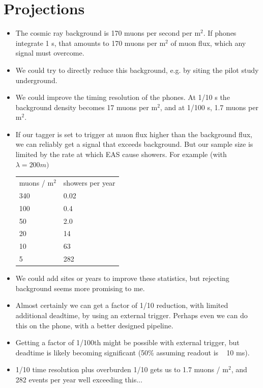 \documentclass[12pt]{article}
\begin{document}
\section{Projections}
\begin{itemize}

\item The cosmic ray background is 170 muons per second per m$^2$.  If
  phones integrate 1 s, that amounts to 170 muons per m$^2$ of muon
  flux, which any signal must overcome.

\item We could try to directly reduce this background, e.g. by siting
  the pilot study underground.

\item We could improve the timing resolution of the phones.  At 1/10 s
  the background density becomes 17 muons per m$^2$, and at 1/100 s, 1.7
  muons per m$^2$.

\item If our tagger is set to trigger at muon flux higher than the background flux, we can reliably get a signal that exceeds background.  But our sample size is limited by the rate at which EAS cause showers.  For example (with $\lambda=200 m)$\\[4pt]
\begin{tabular}{ll}
muons / m$^2$ & showers per year \\
340 & 0.02 \\
100 & 0.4 \\
50  & 2.0 \\
20  & 14 \\
10  & 63 \\
5   & 282 \\
\end{tabular}

\item We could add sites or years to improve these statistics, but
  rejecting background seems more promising to me.

\item Almost certainly we can get a factor of 1/10 reduction, with
  limited additional deadtime, by using an external trigger.  Perhaps
  even we can do this on the phone, with a better designed pipeline.

\item Getting a factor of 1/100th might be possible with external
  trigger, but deadtime is likely becoming significant (50\% assuming
  readout is ~ 10 ms).

\item 1/10 time resolution plus overburden 1/10 gets us to 1.7 muons / m$^2$, and 282 events per year well exceeding this...

\end{itemize}
\end{document}
